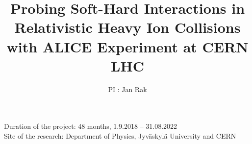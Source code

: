 \documentclass[12pt]{article}
\title{Probing Soft-Hard Interactions in Relativistic Heavy Ion Collisions with ALICE Experiment at CERN LHC}
\author{PI : Jan Rak}
\begin{document}
\maketitle
\begin{flushleft}
Duration of the project: 48 months, 1.9.2018 -- 31.08.2022\\
Site of the research: Department of Physics, Jyv\"askyl\"a University and CERN
\end{flushleft}








%


\end{document}
